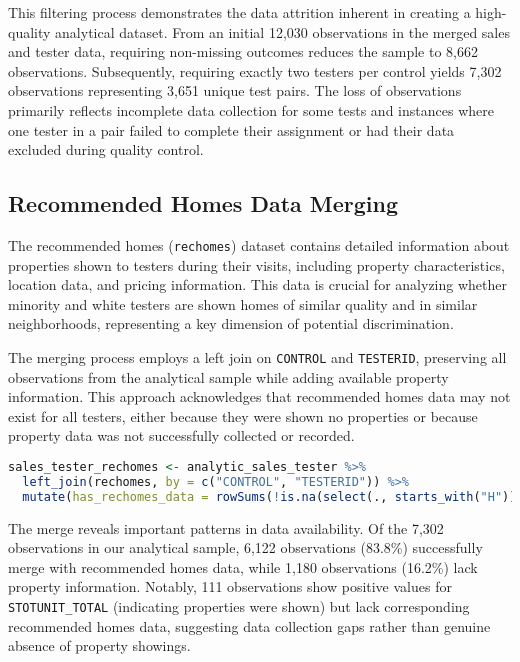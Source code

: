 \documentclass{article}
\begin{document}
This filtering process demonstrates the data attrition inherent in creating a high-quality analytical dataset. From an initial 12,030 observations in the merged sales and tester data, requiring non-missing outcomes reduces the sample to 8,662 observations. Subsequently, requiring exactly two testers per control yields 7,302 observations representing 3,651 unique test pairs. The loss of observations primarily reflects incomplete data collection for some tests and instances where one tester in a pair failed to complete their assignment or had their data excluded during quality control.

\subsection{Recommended Homes Data Merging}

The recommended homes (\texttt{rechomes}) dataset contains detailed information about properties shown to testers during their visits, including property characteristics, location data, and pricing information. This data is crucial for analyzing whether minority and white testers are shown homes of similar quality and in similar neighborhoods, representing a key dimension of potential discrimination.

The merging process employs a left join on \texttt{CONTROL} and \texttt{TESTERID}, preserving all observations from the analytical sample while adding available property information. This approach acknowledges that recommended homes data may not exist for all testers, either because they were shown no properties or because property data was not successfully collected or recorded.

\begin{lstlisting}[language=R]
sales_tester_rechomes <- analytic_sales_tester %>%
  left_join(rechomes, by = c("CONTROL", "TESTERID")) %>%
  mutate(has_rechomes_data = rowSums(!is.na(select(., starts_with("H")))) > 0)
\end{lstlisting}

The merge reveals important patterns in data availability. Of the 7,302 observations in our analytical sample, 6,122 observations (83.8\%) successfully merge with recommended homes data, while 1,180 observations (16.2\%) lack property information. Notably, 111 observations show positive values for \texttt{STOTUNIT\_TOTAL} (indicating properties were shown) but lack corresponding recommended homes data, suggesting data collection gaps rather than genuine absence of property showings.
\end{document}
